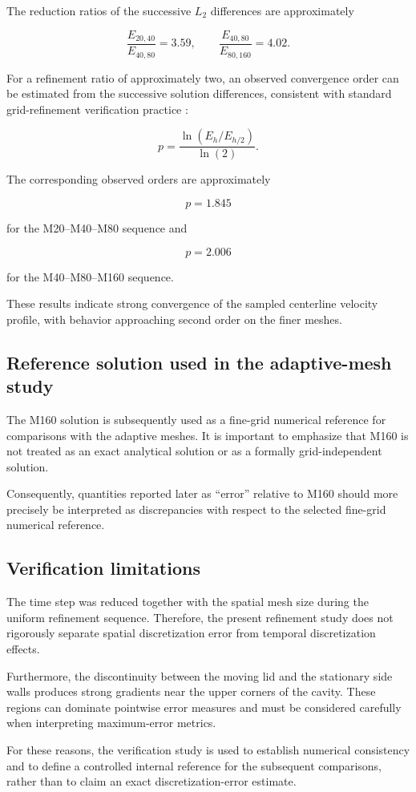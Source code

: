 The reduction ratios of the successive \(L_2\) differences are approximately

\begin{equation}
\frac{E_{20,40}}{E_{40,80}} = 3.59,
\qquad
\frac{E_{40,80}}{E_{80,160}} = 4.02.
\end{equation}

For a refinement ratio of approximately two, an observed convergence order
can be estimated from the successive solution differences, consistent with
standard grid-refinement verification practice
\cite{roache1998,celik2008}:

\begin{equation}
p =
\frac{\ln(E_h/E_{h/2})}{\ln(2)}.
\end{equation}

The corresponding observed orders are approximately

\begin{equation}
p = 1.845
\end{equation}

for the M20--M40--M80 sequence and

\begin{equation}
p = 2.006
\end{equation}

for the M40--M80--M160 sequence.

These results indicate strong convergence of the sampled centerline velocity
profile, with behavior approaching second order on the finer meshes.

\subsection{Reference solution used in the adaptive-mesh study}

The M160 solution is subsequently used as a fine-grid numerical reference
for comparisons with the adaptive meshes. It is important to emphasize that
M160 is not treated as an exact analytical solution or as a formally
grid-independent solution.

Consequently, quantities reported later as ``error'' relative to M160 should
more precisely be interpreted as discrepancies with respect to the selected
fine-grid numerical reference.

\subsection{Verification limitations}

The time step was reduced together with the spatial mesh size during the
uniform refinement sequence. Therefore, the present refinement study does
not rigorously separate spatial discretization error from temporal
discretization effects.

Furthermore, the discontinuity between the moving lid and the stationary
side walls produces strong gradients near the upper corners of the cavity.
These regions can dominate pointwise error measures and must be considered
carefully when interpreting maximum-error metrics.

For these reasons, the verification study is used to establish numerical
consistency and to define a controlled internal reference for the subsequent
comparisons, rather than to claim an exact discretization-error estimate.
